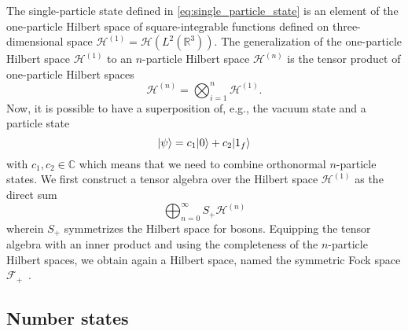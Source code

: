 The single-particle state defined in \cref{eq:single_particle_state} is an element of the one-particle Hilbert space of square-integrable functions defined on three-dimensional space $\mathcal{H}^{(1)}=\mathcal{H}\left(L^2(\mathbb{R}^3)\right)$.
The generalization of the one-particle Hilbert space $\mathcal{H}^{(1)}$ to an $n$-particle Hilbert space $\mathcal{H}^{(n)}$ is the tensor product of one-particle Hilbert spaces
\begin{equation}
	\mathcal{H}^{(n)}
	=
	\bigotimes^n_{i=1}
	\mathcal{H}^{(1)}
	.
\end{equation}
Now, it is possible to have a superposition of, e.g., the vacuum state and a particle state
\begin{equation}
	\lvert\psi\rangle
	=
	c_1
	\lvert0\rangle
	+
	c_2
	\lvert1_f\rangle
\end{equation}
with $c_1,c_2\in\mathbb{C}$ which means that we need to combine orthonormal $n$-particle states.
We first construct a tensor algebra over the Hilbert space $\mathcal{H}^{(1)}$ as the direct sum~\cite[p.~290]{Bogolubov1989}
\begin{equation}
	\bigoplus^\infty_{n=0}
	S_+
	\mathcal{H}^{(n)}
\end{equation}
wherein $S_+$ symmetrizes the Hilbert space for bosons.
Equipping the tensor algebra with an inner product and using the completeness of the $n$-particle Hilbert spaces, we obtain again a Hilbert space, named the symmetric Fock space $\mathcal{F}_+$~\cite[p.~35]{Haag2012}.

\subsection{Number states}

